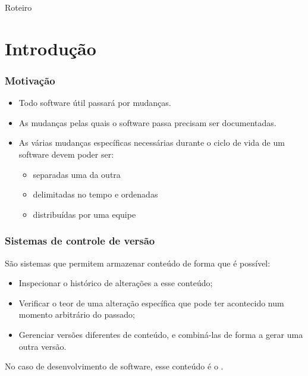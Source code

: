 \documentclass{beamer}
\begin{document}
\begin{frame}{Roteiro}
  \tableofcontents[hideallsubsections]
\end{frame}

\section{Introdução}

\begin{frame}
  \frametitle{Motivação}
  \begin{itemize}
      \pause
    \item Todo software útil passará por mudanças.
      \pause
    \item As mudanças pelas quais o software passa precisam ser
      documentadas.
      \pause
    \item As várias mudanças específicas necessárias durante o ciclo de
      vida de um software devem poder ser:
      \pause
      \begin{itemize}
        \item separadas uma da outra
          \pause
        \item delimitadas no tempo e ordenadas
          \pause
        \item distribuídas por uma equipe
      \end{itemize}
  \end{itemize}
\end{frame}

\begin{frame}
  \frametitle{Sistemas de controle de versão}

  São sistemas que permitem armazenar conteúdo de forma que é possível:
  \pause

  \begin{itemize}
    \item Inspecionar o histórico de alterações a esse conteúdo;
      \pause
    \item Verificar o teor de uma alteração específica que pode ter
      acontecido num momento arbitrário do passado;
      \pause
    \item Gerenciar versões diferentes de conteúdo, e combiná-las de
      forma a gerar uma outra versão.
  \end{itemize}

  \pause
  No caso de desenvolvimento de software, esse conteúdo é o
  .

\end{frame}
\end{document}
